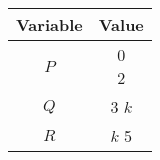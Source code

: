 \begin{tabular}{|c| c |}
\hline
\textbf{Variable} & \textbf{Value} \\
\hline
$P$ & \myvec{0 \\ 2\\}\\
\hline
$Q$ & \myvec{3 \\ $k$\\}\\
\hline
$R$ & \myvec{$k$ \\ 5\\}\\
\hline
\end{tabular}